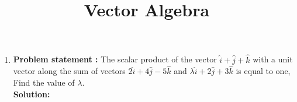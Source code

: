 \documentclass[12pt]{article}
\newcommand{\solution}{\noindent \textbf{Solution: }}
\begin{document}
\begin{center}
\title{\textbf{Vector Algebra}}
\date{\vspace{-5ex}} %
\maketitle
\end{center}

\begin{enumerate}
\item\textbf{Problem statement :} The scalar product of the vector $\hat{i}+\hat{j}+\hat{k}$ with a unit vector along the sum of vectors $2\hat{i}+4\hat{j}-5\hat{k}$ and $\lambda\hat{i}+2\hat{j}+3\hat{k}$ is equal to one, Find the value of $\lambda$.
\\
\solution


\end{enumerate}
\end{document}

